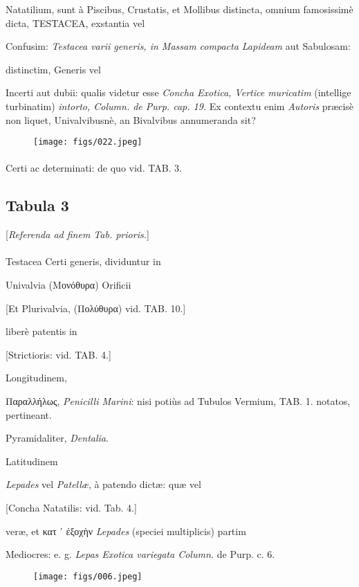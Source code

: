 \documentclass[a4paper, 11pt, oneside, polutonikogreek, german]{article}
\begin{document}
Natatilium, sunt à Piscibus, Crustatis, et Mollibus distincta, omnium famosissimè dicta, TESTACEA, exstantia vel

Confusim: \emph{Testacea varii generis, in Massam compacta Lapideam} aut Sabulosam:

distinctim, Generis vel

Incerti aut dubii: qualis videtur esse \emph{Concha Exotica, Vertice muricatim} (intellige turbinatim) \emph{intorto, Column. de Purp. cap. 19.} Ex contextu enim \emph{Autoris} præcisè non liquet, Univalvibusnè, an Bivalvibus annumeranda sit?
\begin{figure}[H]
\centering
\texttt{[image: figs/022.jpeg]}
\end{figure}
\paragraph{}

Certi ac determinati: de quo vid. TAB. 3.
\clearpage
\subsection{Tabula 3}
\begin{center}
[\emph{Referenda ad finem Tab. prioris.}]
\end{center}
\paragraph{}
Testacea Certi generis, dividuntur in

Univalvia (Μονόθυρα) Orificii

[Et Plurivalvia, (Πολύθυρα) vid. TAB. 10.]

liberè patentis in

[Strictioris: vid. TAB. 4.]

Longitudinem,

Παραλλήλως, \emph{Penicilli Marini}: nisi potiùs ad Tubulos Vermium, TAB. 1. notatos, pertineant.

Pyramidaliter, \emph{Dentalia}.

Latitudinem

\emph{Lepades} vel \emph{Patellæ}, à patendo dictæ: quæ vel

[Concha Natatilis: vid. Tab. 4.]

veræ, et κατ ᾽ ἐξοχὴν \emph{Lepades} (speciei multiplicis) partim

Mediocres: e. g. \emph{Lepas Exotica variegata Column.} de Purp. c. 6.
\begin{figure}[H]
\centering
\texttt{[image: figs/006.jpeg]}
\end{figure}
\end{document}
